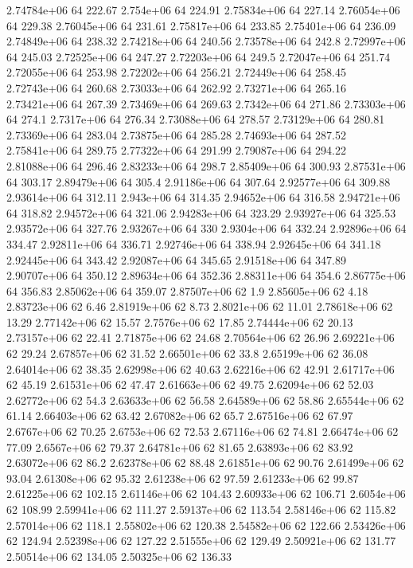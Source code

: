 2.74784e+06 64 222.67
2.754e+06 64 224.91
2.75834e+06 64 227.14
2.76054e+06 64 229.38
2.76045e+06 64 231.61
2.75817e+06 64 233.85
2.75401e+06 64 236.09
2.74849e+06 64 238.32
2.74218e+06 64 240.56
2.73578e+06 64 242.8
2.72997e+06 64 245.03
2.72525e+06 64 247.27
2.72203e+06 64 249.5
2.72047e+06 64 251.74
2.72055e+06 64 253.98
2.72202e+06 64 256.21
2.72449e+06 64 258.45
2.72743e+06 64 260.68
2.73033e+06 64 262.92
2.73271e+06 64 265.16
2.73421e+06 64 267.39
2.73469e+06 64 269.63
2.7342e+06 64 271.86
2.73303e+06 64 274.1
2.7317e+06 64 276.34
2.73088e+06 64 278.57
2.73129e+06 64 280.81
2.73369e+06 64 283.04
2.73875e+06 64 285.28
2.74693e+06 64 287.52
2.75841e+06 64 289.75
2.77322e+06 64 291.99
2.79087e+06 64 294.22
2.81088e+06 64 296.46
2.83233e+06 64 298.7
2.85409e+06 64 300.93
2.87531e+06 64 303.17
2.89479e+06 64 305.4
2.91186e+06 64 307.64
2.92577e+06 64 309.88
2.93614e+06 64 312.11
2.943e+06 64 314.35
2.94652e+06 64 316.58
2.94721e+06 64 318.82
2.94572e+06 64 321.06
2.94283e+06 64 323.29
2.93927e+06 64 325.53
2.93572e+06 64 327.76
2.93267e+06 64 330
2.9304e+06 64 332.24
2.92896e+06 64 334.47
2.92811e+06 64 336.71
2.92746e+06 64 338.94
2.92645e+06 64 341.18
2.92445e+06 64 343.42
2.92087e+06 64 345.65
2.91518e+06 64 347.89
2.90707e+06 64 350.12
2.89634e+06 64 352.36
2.88311e+06 64 354.6
2.86775e+06 64 356.83
2.85062e+06 64 359.07
2.87507e+06 62 1.9
2.85605e+06 62 4.18
2.83723e+06 62 6.46
2.81919e+06 62 8.73
2.8021e+06 62 11.01
2.78618e+06 62 13.29
2.77142e+06 62 15.57
2.7576e+06 62 17.85
2.74444e+06 62 20.13
2.73157e+06 62 22.41
2.71875e+06 62 24.68
2.70564e+06 62 26.96
2.69221e+06 62 29.24
2.67857e+06 62 31.52
2.66501e+06 62 33.8
2.65199e+06 62 36.08
2.64014e+06 62 38.35
2.62998e+06 62 40.63
2.62216e+06 62 42.91
2.61717e+06 62 45.19
2.61531e+06 62 47.47
2.61663e+06 62 49.75
2.62094e+06 62 52.03
2.62772e+06 62 54.3
2.63633e+06 62 56.58
2.64589e+06 62 58.86
2.65544e+06 62 61.14
2.66403e+06 62 63.42
2.67082e+06 62 65.7
2.67516e+06 62 67.97
2.6767e+06 62 70.25
2.6753e+06 62 72.53
2.67116e+06 62 74.81
2.66474e+06 62 77.09
2.6567e+06 62 79.37
2.64781e+06 62 81.65
2.63893e+06 62 83.92
2.63072e+06 62 86.2
2.62378e+06 62 88.48
2.61851e+06 62 90.76
2.61499e+06 62 93.04
2.61308e+06 62 95.32
2.61238e+06 62 97.59
2.61233e+06 62 99.87
2.61225e+06 62 102.15
2.61146e+06 62 104.43
2.60933e+06 62 106.71
2.6054e+06 62 108.99
2.59941e+06 62 111.27
2.59137e+06 62 113.54
2.58146e+06 62 115.82
2.57014e+06 62 118.1
2.55802e+06 62 120.38
2.54582e+06 62 122.66
2.53426e+06 62 124.94
2.52398e+06 62 127.22
2.51555e+06 62 129.49
2.50921e+06 62 131.77
2.50514e+06 62 134.05
2.50325e+06 62 136.33
